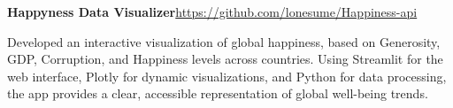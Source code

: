 \documentclass[letterpaper,11pt]{article}
\newcommand{\resumeItem}[1]{
  \item\small{
    {#1 \vspace{-1pt}}
  }
}
\begin{document}
        
        
        
        \resumeItem{\normalsize{\textbf{Happyness Data Visualizer}\hfill \href{https://github.com/lonesume/Happiness-api}{https://github.com/lonesume/Happiness-api}
        
        Developed an interactive visualization of global happiness, based on Generosity, GDP, Corruption, and Happiness levels across countries. Using Streamlit for the web interface, Plotly for dynamic visualizations, and Python for data processing, the app provides a clear, accessible representation of global well-being trends.} 
        }


        
        
\end{document}
